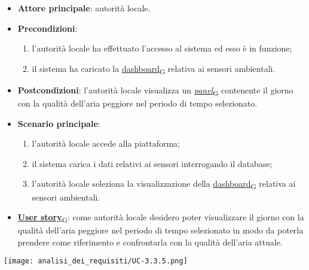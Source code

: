 \newpage
{}
\begin{itemize}
	\item \textbf{Attore principale}: autorità locale.
	\item \textbf{Precondizioni}:
	      \begin{enumerate}
		      \item l'autorità locale ha effettuato l'accesso al sistema ed esso è in funzione;
		      \item il sistema ha caricato la \href{https://7last.github.io/docs/pb/documentazione-interna/glossario\#dashboard}{dashboard\textsubscript{G}} relativa ai sensori ambientali.
	      \end{enumerate}
	\item \textbf{Postcondizioni}: l'autorità locale visualizza un \href{https://7last.github.io/docs/pb/documentazione-interna/glossario\#panel}{\textit{panel}\textsubscript{G}} contenente il giorno con la qualità dell'aria peggiore nel periodo di tempo selezionato.
	\item \textbf{Scenario principale}:
	      \begin{enumerate}
		      \item l'autorità locale accede alla piattaforma;
		      \item il sistema carica i dati relativi ai sensori interrogando il database;
		      \item l'autorità locale seleziona la visualizzazione della \href{https://7last.github.io/docs/pb/documentazione-interna/glossario\#dashboard}{dashboard\textsubscript{G}} relativa ai sensori ambientali.
	      \end{enumerate}
	\item \href{https://7last.github.io/docs/pb/documentazione-interna/glossario\#user-story}{\textbf{User story}\textsubscript{G}}:
	      come autorità locale desidero poter visualizzare il giorno con la qualità dell'aria peggiore nel periodo di tempo selezionato
	      in modo da poterla prendere come riferimento e confrontarla con la qualità dell'aria attuale.
\end{itemize}
\begin{center}
	\texttt{[image: analisi\_dei\_requisiti/UC-3.3.5.png]}
\end{center}

